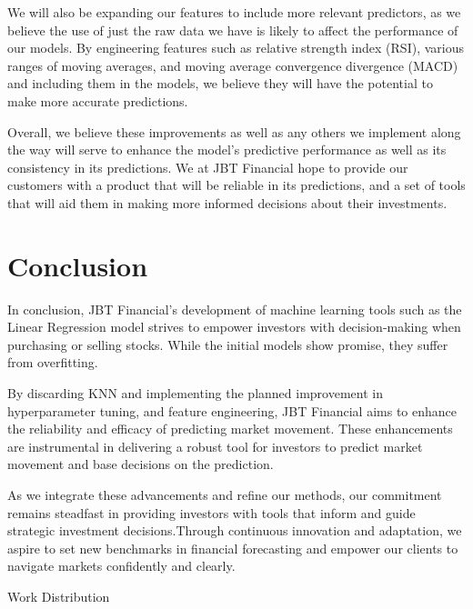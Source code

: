\documentclass[conference]{IEEEtran}
\begin{document}
We will also be expanding our features to include more relevant predictors, as we believe the use of just the raw data we have is likely to affect the performance of our models. By engineering features such as relative strength index (RSI), various ranges of moving averages, and moving average convergence divergence (MACD) and including them in the models, we believe they will have the potential to make more accurate predictions.

Overall, we believe these improvements as well as any others we implement along the way will serve to enhance the model’s predictive performance as well as its consistency in its predictions. We at JBT Financial hope to provide our customers with a product that will be reliable in its predictions, and a set of tools that will aid them in making more informed decisions about their investments.


\section{Conclusion}

In conclusion, JBT Financial's development of machine learning tools such as the Linear Regression model strives to empower investors with decision-making when purchasing or selling stocks. While the initial models show promise, they suffer from overfitting.

By discarding KNN and implementing the planned improvement in hyperparameter tuning, and feature engineering, JBT Financial aims to enhance the reliability and efficacy of predicting market movement. These enhancements are instrumental in delivering a robust tool for investors to predict market movement and base decisions on the prediction.

As we integrate these advancements and refine our methods, our commitment remains steadfast in providing investors with tools that inform and guide strategic investment decisions.Through continuous innovation and adaptation, we aspire to set new benchmarks in financial forecasting and empower our clients to navigate markets confidently and clearly. 

\newpage
\begin{center}
    Work Distribution
\end{center}
\end{document}
